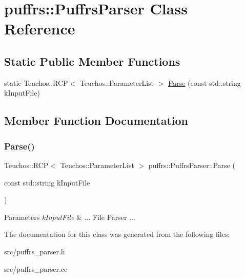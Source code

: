 \hypertarget{classpuffrs_1_1PuffrsParser}{}\section{puffrs\+:\+:Puffrs\+Parser Class Reference}
\label{classpuffrs_1_1PuffrsParser}
\subsection*{Static Public Member Functions}
\begin{DoxyCompactItemize}
\item 
static Teuchos\+::\+R\+CP$<$ Teuchos\+::\+Parameter\+List $>$ \hyperlink{classpuffrs_1_1PuffrsParser_aa41312817bfa20dc93e80790f51a720b}{Parse} (const std\+::string k\+Input\+File)
\end{DoxyCompactItemize}


\subsection{Member Function Documentation}
\mbox{\label{classpuffrs_1_1PuffrsParser_aa41312817bfa20dc93e80790f51a720b}} 
\subsubsection{\texorpdfstring{Parse()}{Parse()}}
{\footnotesize\ttfamily Teuchos\+::\+R\+CP$<$ Teuchos\+::\+Parameter\+List $>$ puffrs\+::\+Puffrs\+Parser\+::\+Parse (\begin{DoxyParamCaption}\item[{const std\+::string}]{k\+Input\+File }\end{DoxyParamCaption})\hspace{0.3cm}{\ttfamily [static]}}


\begin{DoxyParams}{Parameters}
{\em k\+Input\+File} & ... File Parser ... \\
\hline
\end{DoxyParams}


The documentation for this class was generated from the following files\+:\begin{DoxyCompactItemize}
\item 
src/puffrs\+\_\+parser.\+h\item 
src/puffrs\+\_\+parser.\+cc\end{DoxyCompactItemize}
